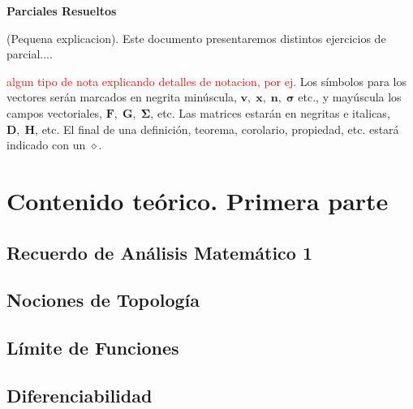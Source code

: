 \documentclass[10pt, a4paper]{report}
\begin{document}
    \newpage

    \setcounter{page}{1}
    \begin{center}
        \textbf{ \noindent \textbf{Parciales Resueltos}}
    \end{center}
    \vspace{3cm}
      
    (Pequena explicacion).  Este documento presentaremos distintos ejercicios de parcial....
    \newpage

    \tableofcontents
        \setcounter{page}{1}
    \vfill
    \textcolor{red}{algun tipo de nota explicando detalles de notacion, por ej.} Los símbolos para los vectores serán marcados en negrita minúscula, $\mathbf{v},\;\mathbf{x},\;\mathbf{n},\;\boldsymbol{\sigma}$ etc., y mayúscula los campos vectoriales, $\mathbf{F},\;\mathbf{G},\;\boldsymbol{\Sigma}$, etc. Las matrices estarán en negritas e italicas, $\boldsymbol{D},\;\boldsymbol{H}$, etc. El final de una definición, teorema, corolario, propiedad, etc. estará indicado con un $\diamond$.

    \chapter{Contenido teórico. Primera parte}
        \section{Recuerdo de Análisis Matemático 1}
            
        \section{Nociones de Topolog\'ia}
            
        \section{L\'imite de Funciones}
            
        \section{Diferenciabilidad}
            
\end{document}
